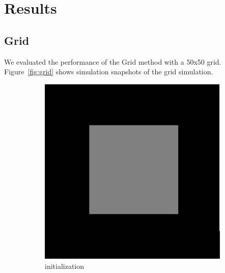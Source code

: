 \section{Results}

\subsection{Grid}

We evaluated the performance of the Grid method with a 50x50 grid. Figure~\ref{fig:grid} shows simulation snapshots of the grid simulation.

\begin{figure}[h]
    \centering
    \begin{subfigure}[b]{0.2\textwidth}
        \includegraphics[width=\textwidth]{figures/grid50_init.png}
        \caption{initialization}
    \end{subfigure}
    \begin{subfigure}[b]{0.2\textwidth}

\end{subfigure}
\end{figure}
